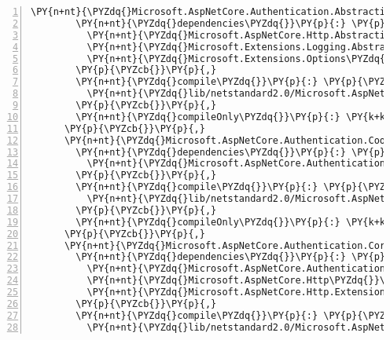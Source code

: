 \begin{Verbatim}[commandchars=\\\{\},numbers=left,firstnumber=1,stepnumber=1,numberblanklines=0]
      \PY{n+nt}{\PYZdq{}Microsoft.AspNetCore.Authentication.Abstractions/2.1.0\PYZhy{}rc1\PYZhy{}final\PYZdq{}}\PY{p}{:} \PY{p}{\PYZob{}}
        \PY{n+nt}{\PYZdq{}dependencies\PYZdq{}}\PY{p}{:} \PY{p}{\PYZob{}}
          \PY{n+nt}{\PYZdq{}Microsoft.AspNetCore.Http.Abstractions\PYZdq{}}\PY{p}{:} \PY{l+s+s2}{\PYZdq{}2.1.0\PYZhy{}rc1\PYZhy{}final\PYZdq{}}\PY{p}{,}
          \PY{n+nt}{\PYZdq{}Microsoft.Extensions.Logging.Abstractions\PYZdq{}}\PY{p}{:} \PY{l+s+s2}{\PYZdq{}2.1.0\PYZhy{}rc1\PYZhy{}final\PYZdq{}}\PY{p}{,}
          \PY{n+nt}{\PYZdq{}Microsoft.Extensions.Options\PYZdq{}}\PY{p}{:} \PY{l+s+s2}{\PYZdq{}2.1.0\PYZhy{}rc1\PYZhy{}final\PYZdq{}}
        \PY{p}{\PYZcb{}}\PY{p}{,}
        \PY{n+nt}{\PYZdq{}compile\PYZdq{}}\PY{p}{:} \PY{p}{\PYZob{}}
          \PY{n+nt}{\PYZdq{}lib/netstandard2.0/Microsoft.AspNetCore.Authentication.Abstractions.dll\PYZdq{}}\PY{p}{:} \PY{p}{\PYZob{}}\PY{p}{\PYZcb{}}
        \PY{p}{\PYZcb{}}\PY{p}{,}
        \PY{n+nt}{\PYZdq{}compileOnly\PYZdq{}}\PY{p}{:} \PY{k+kc}{true}
      \PY{p}{\PYZcb{}}\PY{p}{,}
      \PY{n+nt}{\PYZdq{}Microsoft.AspNetCore.Authentication.Cookies/2.1.0\PYZhy{}rc1\PYZhy{}final\PYZdq{}}\PY{p}{:} \PY{p}{\PYZob{}}
        \PY{n+nt}{\PYZdq{}dependencies\PYZdq{}}\PY{p}{:} \PY{p}{\PYZob{}}
          \PY{n+nt}{\PYZdq{}Microsoft.AspNetCore.Authentication\PYZdq{}}\PY{p}{:} \PY{l+s+s2}{\PYZdq{}2.1.0\PYZhy{}rc1\PYZhy{}final\PYZdq{}}
        \PY{p}{\PYZcb{}}\PY{p}{,}
        \PY{n+nt}{\PYZdq{}compile\PYZdq{}}\PY{p}{:} \PY{p}{\PYZob{}}
          \PY{n+nt}{\PYZdq{}lib/netstandard2.0/Microsoft.AspNetCore.Authentication.Cookies.dll\PYZdq{}}\PY{p}{:} \PY{p}{\PYZob{}}\PY{p}{\PYZcb{}}
        \PY{p}{\PYZcb{}}\PY{p}{,}
        \PY{n+nt}{\PYZdq{}compileOnly\PYZdq{}}\PY{p}{:} \PY{k+kc}{true}
      \PY{p}{\PYZcb{}}\PY{p}{,}
      \PY{n+nt}{\PYZdq{}Microsoft.AspNetCore.Authentication.Core/2.1.0\PYZhy{}rc1\PYZhy{}final\PYZdq{}}\PY{p}{:} \PY{p}{\PYZob{}}
        \PY{n+nt}{\PYZdq{}dependencies\PYZdq{}}\PY{p}{:} \PY{p}{\PYZob{}}
          \PY{n+nt}{\PYZdq{}Microsoft.AspNetCore.Authentication.Abstractions\PYZdq{}}\PY{p}{:} \PY{l+s+s2}{\PYZdq{}2.1.0\PYZhy{}rc1\PYZhy{}final\PYZdq{}}\PY{p}{,}
          \PY{n+nt}{\PYZdq{}Microsoft.AspNetCore.Http\PYZdq{}}\PY{p}{:} \PY{l+s+s2}{\PYZdq{}2.1.0\PYZhy{}rc1\PYZhy{}final\PYZdq{}}\PY{p}{,}
          \PY{n+nt}{\PYZdq{}Microsoft.AspNetCore.Http.Extensions\PYZdq{}}\PY{p}{:} \PY{l+s+s2}{\PYZdq{}2.1.0\PYZhy{}rc1\PYZhy{}final\PYZdq{}}
        \PY{p}{\PYZcb{}}\PY{p}{,}
        \PY{n+nt}{\PYZdq{}compile\PYZdq{}}\PY{p}{:} \PY{p}{\PYZob{}}
          \PY{n+nt}{\PYZdq{}lib/netstandard2.0/Microsoft.AspNetCore.Authentication.Core.dll\PYZdq{}}\PY{p}{:} \PY{p}{\PYZob{}}\PY{p}{\PYZcb{}}

\end{Verbatim}
